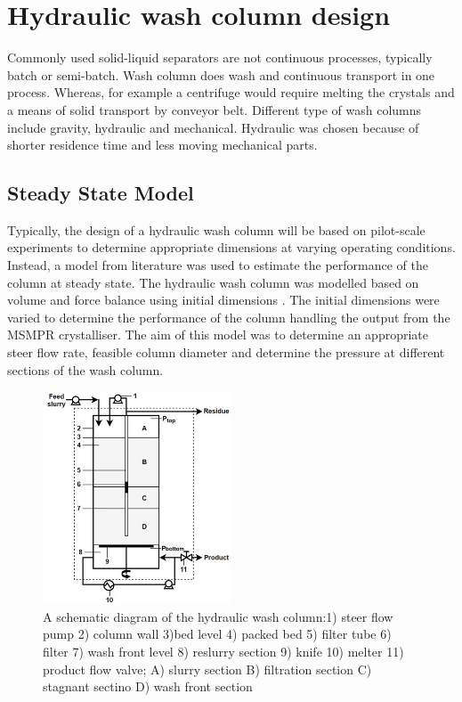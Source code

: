 \section{Hydraulic wash column design}

Commonly used solid-liquid separators are not continuous processes, typically batch or semi-batch. Wash column does wash and continuous transport in one process. Whereas, for example a centrifuge would require  melting the crystals and a means of solid transport by conveyor belt. Different type of wash columns include gravity, hydraulic and mechanical. Hydraulic was chosen because of shorter residence time and less moving mechanical parts. 

\subsection{Steady State Model}   

Typically, the design of a hydraulic wash column will be based on pilot-scale experiments to determine appropriate dimensions at varying operating conditions. Instead, a  model from literature \cite{van_oord-knol_hydraulic_2000} was used to estimate the performance of the column at steady state. The hydraulic wash column was modelled based on volume and force balance using initial dimensions \cite{oordknol_dynamic_2002}. The initial dimensions were varied to determine the performance of the column handling the output from the MSMPR crystalliser. The aim of this model was to determine an appropriate steer flow rate, feasible column diameter and determine the pressure at different sections of the wash column.

\begin{figure}
\centering
\includegraphics[width=0.5\textwidth]{figures/hydraulic.jpg}
\caption{A schematic diagram of the hydraulic wash column:1) steer flow pump 2) column wall 3)bed level 4) packed bed 5) filter tube 6) filter 7) wash front level 8) reslurry section 9) knife 10) melter 11) product flow valve; A) slurry section B) filtration section C) stagnant sectino D) wash front section \cite{van_oord-knol_hydraulic_2000}}
\label{fig:hydraulic}
\end{figure}

